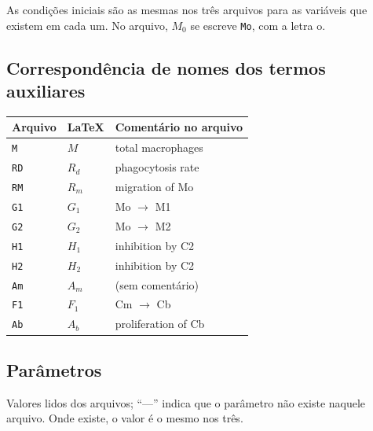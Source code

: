 \documentclass[11pt]{article}
\begin{document}
As condições iniciais são as mesmas nos três arquivos para as variáveis que existem em cada um.
No arquivo, $M_0$ se escreve \texttt{Mo}, com a letra o.

\subsection{Correspondência de nomes dos termos auxiliares}

\begin{longtable}{lll}
\toprule
Arquivo & \LaTeX & Comentário no arquivo \\
\midrule
\endhead
\texttt{M}  & $M$   & total macrophages \\
\texttt{RD} & $R_d$ & phagocytosis rate \\
\texttt{RM} & $R_m$ & migration of Mo \\
\texttt{G1} & $G_1$ & Mo $\to$ M1 \\
\texttt{G2} & $G_2$ & Mo $\to$ M2 \\
\texttt{H1} & $H_1$ & inhibition by C2 \\
\texttt{H2} & $H_2$ & inhibition by C2 \\
\texttt{Am} & $A_m$ & (sem comentário) \\
\texttt{F1} & $F_1$ & Cm $\to$ Cb \\
\texttt{Ab} & $A_b$ & proliferation of Cb \\
\bottomrule
\end{longtable}

\subsection{Parâmetros}

Valores lidos dos arquivos; ``---'' indica que o parâmetro não existe naquele arquivo. Onde
existe, o valor é o mesmo nos três.
\end{document}
